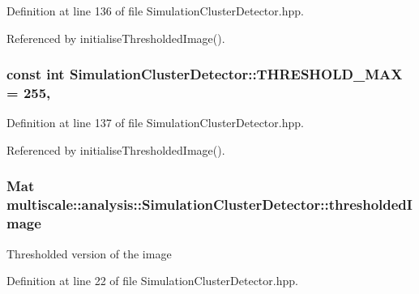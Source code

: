 Definition at line 136 of file Simulation\-Cluster\-Detector.\-hpp.



Referenced by initialise\-Thresholded\-Image().

\hypertarget{classmultiscale_1_1analysis_1_1SimulationClusterDetector_a32b52c0ce7f8a1c8da872aa1cf754317}{
\subsubsection[{T\-H\-R\-E\-S\-H\-O\-L\-D\-\_\-\-M\-A\-X}]{\setlength{\rightskip}{0pt plus 5cm}const int Simulation\-Cluster\-Detector\-::\-T\-H\-R\-E\-S\-H\-O\-L\-D\-\_\-\-M\-A\-X = 255\hspace{0.3cm}{\ttfamily [static]}, {\ttfamily [private]}}}\label{classmultiscale_1_1analysis_1_1SimulationClusterDetector_a32b52c0ce7f8a1c8da872aa1cf754317}


Definition at line 137 of file Simulation\-Cluster\-Detector.\-hpp.



Referenced by initialise\-Thresholded\-Image().

\hypertarget{classmultiscale_1_1analysis_1_1SimulationClusterDetector_aca2aae9914ef643a543a834e61b1cccf}{
\subsubsection[{thresholded\-Image}]{\setlength{\rightskip}{0pt plus 5cm}Mat multiscale\-::analysis\-::\-Simulation\-Cluster\-Detector\-::thresholded\-Image\hspace{0.3cm}{\ttfamily [private]}}}\label{classmultiscale_1_1analysis_1_1SimulationClusterDetector_aca2aae9914ef643a543a834e61b1cccf}
Thresholded version of the image 

Definition at line 22 of file Simulation\-Cluster\-Detector.\-hpp.



